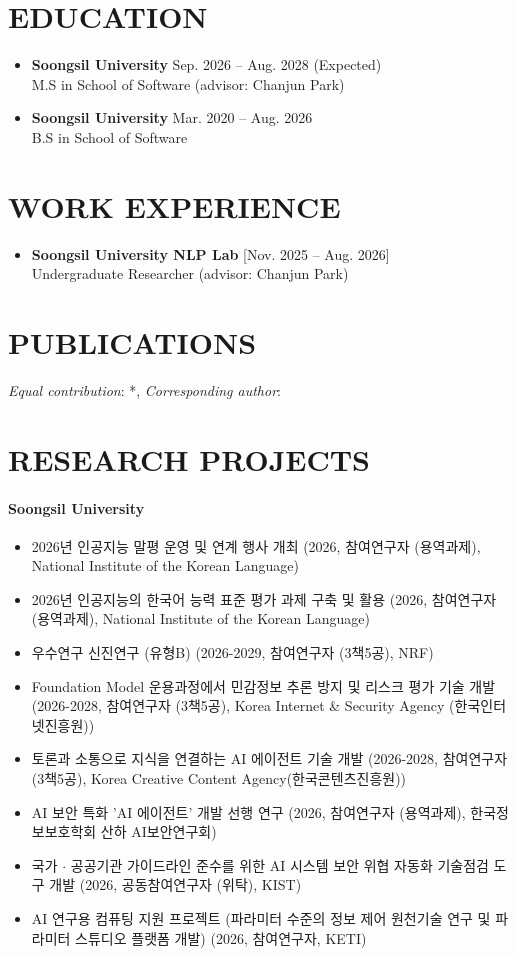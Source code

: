 \documentclass[10pt,a4paper]{article} %
\newcommand{\seclabel}[1]{\section*{\uppercase{#1}}}
\newcommand{\cvitem}[2]{\textbf{#1} \hfill \small{#2}\\}
\begin{document}
\seclabel{Education}
\begin{itemize}[left=0pt]
    \item \cvitem{Soongsil University}{\small{Sep. 2026 -- Aug. 2028 (Expected)}}
    \small{M.S in School of Software (advisor: Chanjun Park)} \vspace{0.6em}
    \item \cvitem{Soongsil University}{\small{Mar. 2020 -- Aug. 2026}}
    \small{B.S in School of Software}
\end{itemize}

\seclabel{Work Experience}
\begin{itemize}[left=0pt]
    \item \cvitem{Soongsil University NLP Lab}{\small{[Nov. 2025 -- Aug. 2026]}}
    \small{Undergraduate Researcher (advisor: Chanjun Park)}
\end{itemize}

\newpage

\seclabel{Publications}
\textit{Equal contribution}: *, \textit{Corresponding author}: \dag

\newpage

\seclabel{Research Projects}
\paragraph{Soongsil University}
\begin{itemize}[left=0pt]
    \item \small{2026년 인공지능 말평 운영 및 연계 행사 개최 (2026, 참여연구자 (용역과제), National Institute of the Korean Language)}
    \item \small{2026년 인공지능의 한국어 능력 표준 평가 과제 구축 및 활용 (2026, 참여연구자 (용역과제), National Institute of the Korean Language)}
    \item \small{우수연구 신진연구 (유형B) (2026-2029, 참여연구자 (3책5공), NRF)}
    \item \small{Foundation Model 운용과정에서 민감정보 추론 방지 및 리스크 평가 기술 개발 (2026-2028, 참여연구자 (3책5공), Korea Internet \& Security Agency (한국인터넷진흥원))}
    \item \small{토론과 소통으로 지식을 연결하는 AI 에이전트 기술 개발 (2026-2028, 참여연구자 (3책5공), Korea Creative Content Agency(한국콘텐츠진흥원))}
    \item \small{AI 보안 특화 'AI 에이전트' 개발 선행 연구 (2026, 참여연구자 (용역과제), 한국정보보호학회 산하 AI보안연구회)}
    \item \small{국가 $\cdot$ 공공기관 가이드라인 준수를 위한 AI 시스템 보안 위협 자동화 기술점검 도구 개발 (2026, 공동참여연구자 (위탁), KIST)}
    \item \small{AI 연구용 컴퓨팅 지원 프로젝트 (파라미터 수준의 정보 제어 원천기술 연구 및 파라미터 스튜디오 플랫폼 개발) (2026, 참여연구자, KETI)}
\end{itemize}
\end{document}
